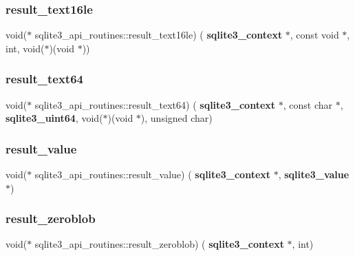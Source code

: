 \subsubsection{result\_text16le}
{\footnotesize\ttfamily void($\ast$ sqlite3\+\_\+api\+\_\+routines\+::result\+\_\+text16le) (\textbf{ sqlite3\+\_\+context} $\ast$, const void $\ast$, int, void($\ast$)(void $\ast$))}

\mbox{\label{structsqlite3__api__routines_af2a0506a21f0c52b06d1104af25b1555}} 
\subsubsection{result\_text64}
{\footnotesize\ttfamily void($\ast$ sqlite3\+\_\+api\+\_\+routines\+::result\+\_\+text64) (\textbf{ sqlite3\+\_\+context} $\ast$, const char $\ast$, \textbf{ sqlite3\+\_\+uint64}, void($\ast$)(void $\ast$), unsigned char)}

\mbox{\label{structsqlite3__api__routines_a077437fd729730e66afab9eb487ca10c}} 
\subsubsection{result\_value}
{\footnotesize\ttfamily void($\ast$ sqlite3\+\_\+api\+\_\+routines\+::result\+\_\+value) (\textbf{ sqlite3\+\_\+context} $\ast$, \textbf{ sqlite3\+\_\+value} $\ast$)}

\mbox{\label{structsqlite3__api__routines_a9bd6a486d3a06555e019e02ab269439c}} 
\subsubsection{result\_zeroblob}
{\footnotesize\ttfamily void($\ast$ sqlite3\+\_\+api\+\_\+routines\+::result\+\_\+zeroblob) (\textbf{ sqlite3\+\_\+context} $\ast$, int)}

\mbox{\label{structsqlite3__api__routines_aa2107e2591aa7a9e0e883b1972d32492}} 
